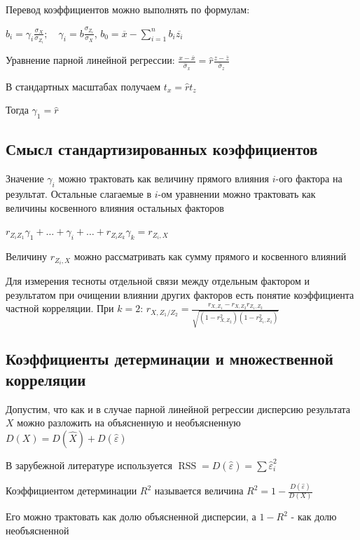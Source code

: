 \documentclass[12pt]{article}
\begin{document}
Перевод коэффициентов можно выполнять по формулам:

$b_i = \gamma_i \frac{\sigma_X}{\sigma_{Z_i}}; \quad \gamma_i = b \frac{\sigma_{Z_i}}{\sigma_X}$, $b_0 = \overline{x} - \sum_{i = 1}^n b_i \overline{z_i}$

\Ex Уравнение парной линейной регрессии:
$\frac{x - \overline{x}}{\hat \sigma_x} = \hat r \frac{z - \overline{z}}{\hat \sigma_z}$

В стандартных масштабах получаем $t_x = \hat r t_z$

Тогда $\gamma_1 = \hat r$

\subsection{Смысл стандартизированных коэффициентов}

Значение $\gamma_i$ можно трактовать как величину прямого влияния $i$-ого фактора на результат. Остальные слагаемые в $i$-ом уравнении можно трактовать
как величины косвенного влияния остальных факторов 

$r_{Z_i Z_1} \gamma_1 + \dots + \gamma_i + \dots + r_{Z_i Z_k} \gamma_k = r_{Z_i, X}$

Величину $r_{Z_i, X}$ можно рассматривать как сумму прямого и косвенного влияний

\Nota Для измерения тесноты отдельной связи между отдельным фактором и результатом при очищении влиянии других факторов
есть понятие коэффициента частной корреляции. При $k = 2$: $r_{X, Z_1 / Z_2} = \frac{r_{X, Z_1} - r_{X, Z_2} r_{Z_1, Z_2}}{\sqrt{(1 - r_{X, Z_2}^2)(1 - r_{Z_1, Z_2}^2)}}$


\subsection{Коэффициенты детерминации и множественной корреляции}

Допустим, что как и в случае парной линейной регрессии дисперсию результата $X$ можно разложить на объясненную и необъясненную $D(X) = D(\hat X) + D(\hat \varepsilon)$

\Nota В зарубежной литературе используется $\operatorname{RSS} = D(\hat \varepsilon) = \sum \hat \varepsilon_i^2$

\Def Коэффициентом детерминации $R^2$ называется величина $R^2 = 1 - \frac{D(\hat \varepsilon)}{D(X)}$

Его можно трактовать как долю объясненной дисперсии, а $1 - R^2$ - как долю необъясненной
\end{document}
